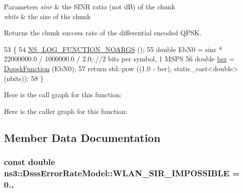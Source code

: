 \begin{DoxyParams}{Parameters}
{\em sinr} & the S\+I\+NR ratio (not dB) of the chunk \\
\hline
{\em nbits} & the size of the chunk\\
\hline
\end{DoxyParams}
\begin{DoxyReturn}{Returns}
the chunk success rate of the differential encoded Q\+P\+SK. 
\end{DoxyReturn}

\begin{DoxyCode}
53 \{
54   \hyperlink{log-macros-disabled_8h_a8f7e4afc291c9d29a65c18ac1f79197b}{NS\_LOG\_FUNCTION\_NOARGS} ();
55   \textcolor{keywordtype}{double} EbN0 = sinr * 22000000.0 / 1000000.0 / 2.0; \textcolor{comment}{//2 bits per symbol, 1 MSPS}
56   \textcolor{keywordtype}{double} \hyperlink{lte__cqi__generation_8m_a197619a3539acfc577325d6e41b6ce95}{ber} = \hyperlink{classns3_1_1DsssErrorRateModel_af92549280fdcedac6d4cc697e0992321}{DqpskFunction} (EbN0);
57   \textcolor{keywordflow}{return} std::pow ((1.0 - ber), static\_cast<double> (nbits));
58 \}
\end{DoxyCode}


Here is the call graph for this function\+:




Here is the caller graph for this function\+:




\subsection{Member Data Documentation}
\subsubsection[{\texorpdfstring{W\+L\+A\+N\+\_\+\+S\+I\+R\+\_\+\+I\+M\+P\+O\+S\+S\+I\+B\+LE}{WLAN_SIR_IMPOSSIBLE}}]{\setlength{\rightskip}{0pt plus 5cm}const double ns3\+::\+Dsss\+Error\+Rate\+Model\+::\+W\+L\+A\+N\+\_\+\+S\+I\+R\+\_\+\+I\+M\+P\+O\+S\+S\+I\+B\+LE = 0.\hspace{0.3cm}{\ttfamily [static]}, {\ttfamily [protected]}}\hypertarget{classns3_1_1DsssErrorRateModel_ab2d065a2e6978215da5fc5a1c8d74a37}{}\label{classns3_1_1DsssErrorRateModel_ab2d065a2e6978215da5fc5a1c8d74a37}


